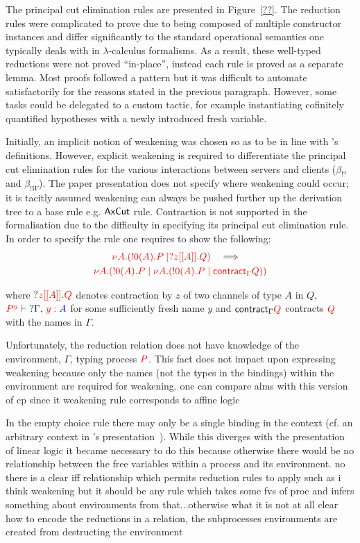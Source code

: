

The principal cut elimination rules are presented in Figure~\ref{??}. The
reduction rules were complicated to prove due to being composed of multiple
constructor instances and differ significantly to the standard operational
semantics one typically deals with in $\lambda$-calculus formalisms. As a
result, these well-typed reductions were not proved ``in-place'', instead each
rule is proved as a separate lemma. Most proofs followed a pattern but it was
difficult to automate satisfactorily for the reasons stated in the previous
paragraph. However, some tasks could be delegated to a custom tactic, for
example instantiating cofinitely quantified hypotheses with a newly introduced
fresh variable.

Initially, an implicit notion of weakening was chosen so as to be in line with
\citeauthor{Wadler:2014}'s definitions. However, explicit weakening is
required to differentiate the principal cut elimination rules for the various
interactions between servers and clients ($\beta_{!?}$ and $\beta_{!W}$). The
paper presentation does not specify where weakening could occur; it is tacitly
assumed weakening can always be pushed further up the derivation tree to a
base rule e.g. $\textsf{Ax}\textsf{Cut}$ rule. Contraction is not supported in the
formalisation due to the difficulty in specifying its principal cut
elimination rule. In order to specify the rule one requires to show the
following:
\begin{gather*}
{\color{red}\nu A.(!0(A).P \mid ?z[[A]].Q)}
\quad \Longrightarrow \quad \\
{\color{red} \nu A.(!0(A).P \mid \nu A.(!0(A).P \mid \textsf{contract}_{\Gamma} Q))}
\end{gather*}

where ${\color{red} ?z[[A]].Q}$ denotes contraction by $z$ of two channels of type $A$
in $Q$, ${\color{red} P^y} {\color{blue} {} \vdash {}} {\color{blue} {?\Gamma} ,\, {\color{red} y:{}}A}$ for some
sufficiently fresh name $y$ and $\textsf{contract}_{\Gamma} {\color{red} Q}$ contracts
${\color{red} Q}$ with the names in $\Gamma$.

Unfortunately, the reduction relation does not have knowledge of the
environment, $\Gamma$, typing process ${\color{red} P}$. This fact does not impact upon
expressing weakening because only the names (not the types in the bindings)
within the environment are required for weakening. one can compare alms with this version of cp
since it weakening rule corresponds to affine logic

In the empty choice rule there may only be a single binding in the context
(cf. an arbitrary context in \citeauthor{Wadler:2014}'s
presentation~\cite{Wadler:2014}). While this diverges with the presentation of
linear logic it became necessary to do this because otherwise there would be
no relationship between the free variables within a process and its
environment. no there is a clear iff relationship which permits reduction
rules to apply such as i think weakening but it should be any rule which takes
some fvs of proc and infers something about environments from that...otherwise
what it is not at all clear how to encode the reductions in a relation, the
subprocesses environments are created from destructing the environment

